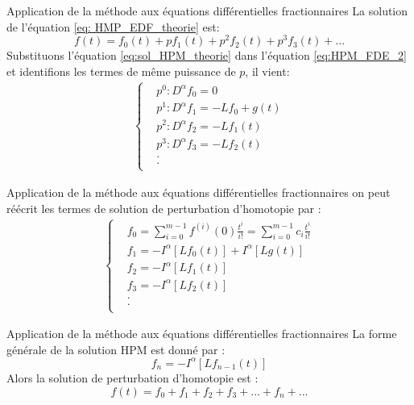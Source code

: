 \documentclass{sintefbeamer}
\begin{document}
\begin{frame}{Application de la méthode aux équations différentielles fractionnaires}
La solution de l'équation \ref{eq: HMP_EDF_theorie} est:
  \begin{equation} \label{eq:sol_HPM_theorie}
      f(t)=f_0(t)+pf_1(t)+p^2f_2(t)+p^3f_3(t) + ...
  \end{equation}
    Substituons l'équation \ref{eq:sol_HPM_theorie} dans l'équation \ref{eq:HPM_FDE_2} et identifions les termes de même puissance de $p$, il vient:
  \begin{align*}
  \begin{cases}
            & p^0 : D^{\alpha} f_0 = 0\\
      & p^1 : D^{\alpha} f_1 = -Lf_0 + g(t)\\
      & p^2 : D^{\alpha} f_2 = -Lf_1(t)\\
      & p^3 : D^{\alpha} f_3 = -Lf_2(t)\\
      & .\\
      & .\\
  \end{cases}
  \end{align*}
\end{frame}

\begin{frame}{Application de la méthode aux équations différentielles fractionnaires}
    on peut réécrit les termes de solution de perturbation d'homotopie par :
\begin{align*}
    \begin{cases}
        & f_0 = \sum_{i=0}^{m-1} f^{(i)}(0) \frac{t^i}{i!} = \sum _{i=0}^{m-1} c_i \frac{t^i}{i!} \\
          & f_1 = -I^{\alpha} [Lf_0(t)] + I^{\alpha}[Lg(t)]\\
          & f_2 = -I^{\alpha}[Lf_1(t)]\\
          & f_3 = -I^{\alpha}[Lf_2(t)]\\
          & .\\
          & .\\
    \end{cases}
  \end{align*}
\end{frame}

 \begin{frame}{Application de la méthode aux équations différentielles fractionnaires}
     La forme générale de la solution HPM est donné par :
\begin{equation}
    f_n=-I^{\alpha}[Lf_{n-1}(t)]
\end{equation}
Alors la solution de perturbation d'homotopie est :
\begin{equation}
    f(t)=f_0+f_1+f_2+f_3 + ... +f_n + ...
\end{equation}
 \end{frame}
\end{document}
